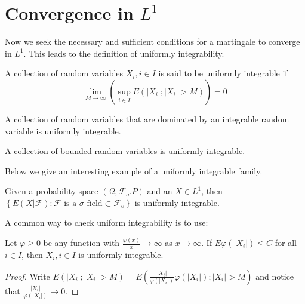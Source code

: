 \section{\texorpdfstring{Convergence in $L^1$}{Convergence in L1}}
Now we seek the necessary and sufficient conditions for a martingale to converge in $L^1$. This leads to the definition of uniformly integrability.
\begin{definition}
A collection of random variables $X_i,i\in I$ is said to be uniformly integrable if 
\[\lim_{M\to\infty}(\sup_{i\in I}E(\left|X_i\right|;\left|X_i\right|>M))=0\]
\end{definition}
\begin{example}
    A collection of random variables that are dominated by an integrable random variable is uniformly integrable.
\end{example}
\begin{example}
    A collection of bounded random variables is uniformly integrable.
\end{example}
Below we give an interesting example of a uniformly integrable family.
\begin{theorem}
Given a probability space $(\Omega,\mathcal{F}_o.P)$ and an $X\in L^1$, then $\left\{E(X|\mathcal{F}):\mathcal{F}\text{ is a }\sigma\text{-field}\subset\mathcal{F}_o\right\}$ is uniformly integrable.
\end{theorem}

A common way to check uniform integrability is to use:
\begin{lemma}
Let $\varphi\ge 0$ be any function with $\frac{\varphi(x)}{x}\to\infty$ as $x\to\infty$. If $E\varphi(\left|X_i\right|)\le C$ for all $i\in I$, then $X_i,i\in I$ is uniformly integrable.
\end{lemma}
\begin{proof}
    Write $E(\left|X_i\right|;\left|X_i\right|>M)=E(\frac{\left|X_i\right|}{\varphi(\left|X_i\right|)}\varphi(\left|X_i\right|);\left|X_i\right|>M)$ and notice that $\frac{\left|X_i\right|}{\varphi(\left|X_i\right|)}\to 0$.
\end{proof}



